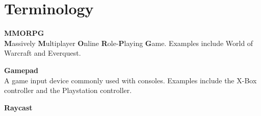 \section*{Terminology}\label{preface:terminology}
\textbf{MMORPG}\vspace{4pt}\\
\textbf{M}assively \textbf{M}ultiplayer \textbf{O}nline \textbf{R}ole-\textbf{P}laying \textbf{G}ame.
Examples include World of Warcraft and Everquest.

\textbf{Gamepad}\vspace{4pt}\\
A game input device commonly used with consoles.
Examples include the X-Box controller and the Playstation controller.

\textbf{Raycast}
